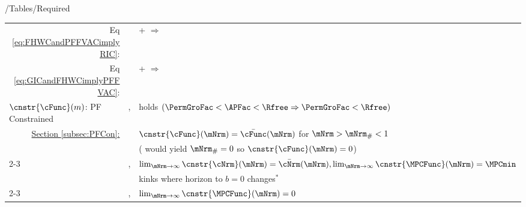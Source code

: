 \documentclass[\econtexRoot/BufferStockTheory]{subfiles}
\providecommand{\TblName}{}
\renewcommand{\TblName}{Required}
\begin{document}
\begin{verbatimwrite}{\econtexRoot/Tables/\TblName}
\begin{table}
{\begin{tabular}{|l|l|l|}
        \\ \multicolumn{1}{|r|}{Eq \eqref{eq:FHWCandPFFVACimplyRIC}:}                                                                              &                                         & {\PFFVAC}+{\FHWC} $\Rightarrow$ {\RIC}         
        \\ \multicolumn{1}{|r|}{{Eq \eqref{eq:GICandFHWCimplyPFFVAC}}:}                                                                              &                                         & {\GICRaw}+{\FHWC} $\Rightarrow$ {\PFFVAC}         
        \\ \hline\hline \multicolumn{1}{|l|}{$\cnstr{\cFunc}(m)$: PF Constrained}                                              & \cncl{\GICRaw}, \RIC                    & {\FHWC} holds $(\PermGroFac < \APFac < \Rfree \Rightarrow \PermGroFac < \Rfree)$
        \\
        \multicolumn{1}{|r|}{\hyperlink{PF-Constrained-Solution}{Section \ref{subsec:PFCon}:}}                &                                         & $\cnstr{\cFunc}(\mNrm)=\bar{\cFunc}(\mNrm)$ for $\mNrm > \mNrm_{\#} < 1$
        \\                                                                                                                        &                                         & (\cncl{\RIC} would yield $\mNrm_{\#}=0$ so $\cnstr{\cFunc}(\mNrm)=0$)
        \\ \cline{2-3}  \multicolumn{1}{|r|}{\hyperlink{ApndxLiqConstr}{Appendix \ref{sec:ApndxLiqConstr}}:} & \GICRaw,\RIC                            & $\lim_{\mNrm \rightarrow \infty} \cnstr{\cNrm}(\mNrm)=\bar{\cNrm}(\mNrm), \lim_{\mNrm \rightarrow \infty} \cnstr{\MPCFunc}(\mNrm)=\MPCmin$                                                                                                                                                                       
        \\                                                                                                                        &                                         & kinks where horizon to $b=0$ changes$^{\ast}$
        \\ \cline{2-3}\multicolumn{1}{|r|}{\hyperlink{ApndxLiqConstr}{Appendix \ref{sec:ApndxLiqConstr}}:}  & \GICRaw,\cncl{\RIC}                     & $\lim_{\mNrm \rightarrow \infty}  \cnstr{\MPCFunc}(\mNrm)=0$

\end{tabular}}
\end{table}
\end{verbatimwrite}
\end{document}
